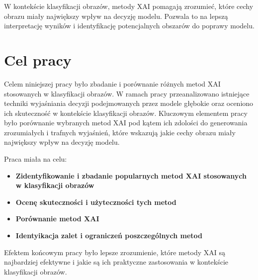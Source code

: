 W kontekście klasyfikacji obrazów, metody XAI pomagają zrozumieć, które cechy obrazu miały największy wpływ na decyzję modelu.
Pozwala to na lepszą interpretację wyników i identyfikację potencjalnych obszarów do poprawy modelu.

\section*{Cel pracy}
Celem niniejszej pracy było zbadanie i porównanie różnych metod XAI stosowanych w klasyfikacji obrazów.
W ramach pracy przeanalizowano istniejące techniki wyjaśniania decyzji podejmowanych przez modele głębokie oraz oceniono ich skuteczność w kontekście klasyfikacji obrazów.
Kluczowym elementem pracy było porównanie wybranych metod XAI pod kątem ich zdolości do generowania zrozumiałych i trafnych wyjaśnień, które wskazują jakie cechy obrazu miały największy wpływ na decyzję modelu.

Praca miała na celu:
\begin{itemize}
	\item \textbf{Zidentyfikowanie i zbadanie popularnych metod XAI stosowanych w klasyfikacji obrazów}
	\item \textbf{Ocenę skuteczności i użyteczności tych metod}
	\item \textbf{Porównanie metod XAI}
	\item \textbf{Identyikacja zalet i ograniczeń poszczególnych metod}
\end{itemize}

Efektem końcowym pracy było lepsze zrozumienie, które metody XAI są najbardziej efektywne i jakie są ich praktyczne zastosowania w kontekście klasyfikacji obrazów.

